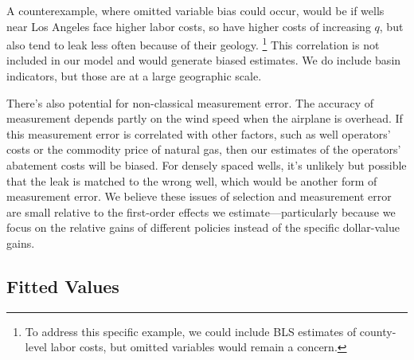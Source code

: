 \documentclass[12pt,oneside,letterpaper]{article}
\theoremstyle{definition}
\begin{document}
\begin{refsection}
A counterexample, where omitted variable bias could occur, would be if wells near Los Angeles face higher labor costs, so have higher costs of increasing \(q\), but also tend to leak less often because of their geology.%
\footnote{To address this specific example, we could include \gls{BLS} estimates of county-level labor costs, but omitted variables would remain a concern.}
This correlation is not included in our model and would generate biased estimates.
We do include basin indicators, but those are at a large geographic scale.

There's also potential for non-classical measurement error.
The accuracy of measurement depends partly on the wind speed when the airplane is overhead.
If this measurement error is correlated with other factors, such as well operators' costs or the commodity price of natural gas, then our estimates of the operators' abatement costs will be biased.
For densely spaced wells, it's unlikely but possible that the leak is matched to the wrong well, which would be another form of measurement error.
We believe these issues of selection and measurement error are small relative to the first-order effects we estimate---particularly because we focus on the relative gains of different policies instead of the specific dollar-value gains.


\subsection{Fitted Values}
\label{sec:fitted-values}



\end{refsection}
\end{document}
